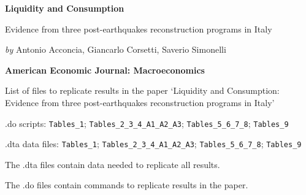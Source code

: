 \documentclass{article}
\begin{document}
\begin{center}

\textbf{Liquidity and Consumption}

Evidence from three post-earthquakes reconstruction programs in Italy

\bigskip 
\emph{by} Antonio Acconcia, Giancarlo Corsetti, Saverio Simonelli

\bigskip 
\textbf{American Economic Journal: Macroeconomics}
\end{center}

\noindent List of files to replicate results in the paper `Liquidity and Consumption: Evidence from three post-earthquakes reconstruction programs in Italy'

\bigskip

.do scripts: \texttt{Tables\_1}; \texttt{Tables\_2\_3\_4\_A1\_A2\_A3}; \texttt{Tables\_5\_6\_7\_8}; \texttt{Tables\_9}

\bigskip

.dta data files: \texttt{Tables\_1}; \texttt{Tables\_2\_3\_4\_A1\_A2\_A3}; \texttt{Tables\_5\_6\_7\_8}; \texttt{Tables\_9}

\bigskip

The .dta files contain data needed to replicate all results.

The .do files contain commands to replicate results in the paper.
\end{document}
